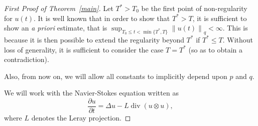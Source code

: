 \documentclass[12pt]{amsart}
\theoremstyle{remark}
\newcommand{\snormo}[1]{{\mathopen\|#1\mathclose\|}}
\DeclareMathOperator{\divergence}{div}
\begin{document}
\begin{proof}[First Proof of Theorem~\ref{main}]
Let $T^* > T_0$ be the first point of non-regularity for $u(t)$.
It is well known that 
in order to show that $T^* > T$,
it is sufficient to show an \emph{a priori} estimate, that is
$\sup_{T_0 \le t < \min\{T^*,T\}} \snormo{u(t)}_q < \infty$.
This is because it is then possible to extend the regularity beyond
$T^*$ if $T^* \le T$.
Without loss of generality, it is sufficient to consider the case
$T = T^*$ (so as to obtain a contradiction).

Also, from now on, we will allow all constants to implicitly
depend upon $p$ and $q$.

We will work with the Navier-Stokes equation written as
$$ \frac{\partial u}{\partial t} = 
   \Delta u - L \divergence(u \otimes u) ,$$
where $L$ denotes the Leray projection.


\end{proof}
\end{document}
